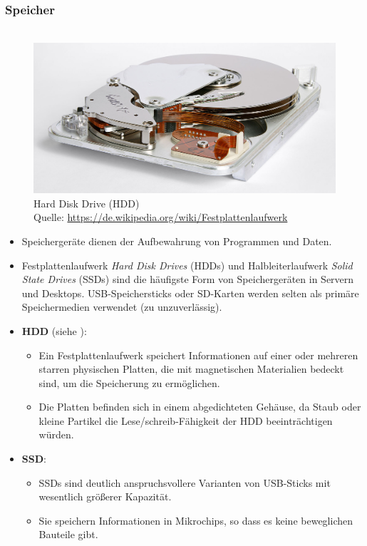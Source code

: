~\\
	\subsubsection{Speicher}
	\begin{figure}[h!]
		\centering
		~\\
		\includegraphics[width=0.5\linewidth]{./media/hdd} \\
		\tiny
		Hard Disk Drive (HDD)\\
		Quelle: \url{https://de.wikipedia.org/wiki/Festplattenlaufwerk}
	\end{figure}
	\begin{itemize}
		\item Speichergeräte dienen der Aufbewahrung von Programmen und Daten.
		\item Festplattenlaufwerk \textit{Hard Disk Drives} (HDDs) und Halbleiterlaufwerk \textit{Solid State Drives} (SSDs) sind die häufigste Form von Speichergeräten in Servern und Desktops. USB-Speichersticks oder SD-Karten werden selten als primäre Speichermedien verwendet (zu unzuverlässig).
		\item \textbf{HDD} (siehe ):
		\begin{itemize}
			\item  Ein Festplattenlaufwerk speichert Informationen auf einer oder mehreren starren physischen Platten, die mit magnetischen Materialien bedeckt sind, um die Speicherung zu ermöglichen.
			\item Die Platten befinden sich in einem abgedichteten Gehäuse, da Staub oder kleine Partikel die Lese/schreib-Fähigkeit der HDD beeinträchtigen würden.
		\end{itemize}
		\item \textbf{SSD}:\begin{itemize}
			\item  SSDs sind deutlich anspruchsvollere Varianten von USB-Sticks mit wesentlich größerer Kapazität.
			\item Sie speichern Informationen in Mikrochips, so dass es keine beweglichen Bauteile gibt.
		\end{itemize}
	\end{itemize}
